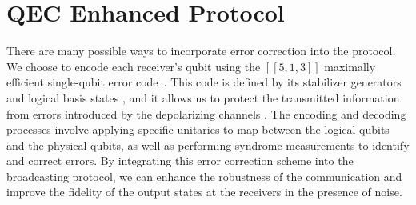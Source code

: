 \section{QEC Enhanced Protocol}
There are many possible ways to incorporate error correction into the protocol. We choose to encode each receiver's qubit using the $[[5,1,3]]$ maximally efficient single-qubit error code~\cite{laflamme1996perfect,knill1997theory}. This code is defined by its stabilizer generators and logical basis states \cite{gottesman1997stabilizer,calderbank1998quantum}, and it allows us to protect the transmitted information from errors introduced by the depolarizing channels \cite{devitt2013qec}. The encoding and decoding processes involve applying specific unitaries to map between the logical qubits and the physical qubits, as well as performing syndrome measurements to identify and correct errors. By integrating this error correction scheme into the broadcasting protocol, we can enhance the robustness of the communication and improve the fidelity of the output states at the receivers in the presence of noise.

